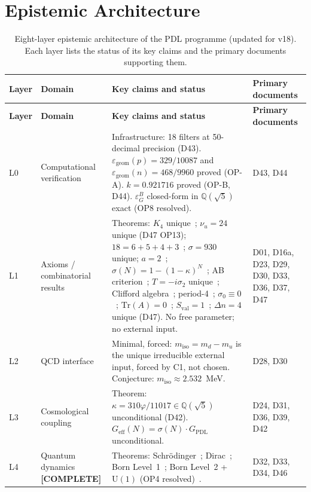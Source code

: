 \documentclass[11pt,a4paper]{article}
\theoremstyle{plain}
\theoremstyle{definition}
\theoremstyle{remark}
\newcommand{\Geff}{G_{\mathrm{eff}}}
\newcommand{\GPDL}{G_{\mathrm{PDL}}}
\newcommand{\sigmaN}{\sigma(N)}
\newcommand{\epsGeomB}{\varepsilon_G^B}
\begin{document}
\section{Epistemic Architecture}
\label{sec:epistemic}

\begin{longtable}{L{0.6cm}L{3.0cm}L{5.5cm}L{4.0cm}}
\caption{Eight-layer epistemic architecture of the PDL programme (updated for v18). Each layer lists the status of its key claims and the primary documents supporting them.}
\label{tab:epistemic}\\
\toprule
\textbf{Layer} & \textbf{Domain} & \textbf{Key claims and status} & \textbf{Primary documents}\\
\midrule
\endfirsthead
\toprule
\textbf{Layer} & \textbf{Domain} & \textbf{Key claims and status} & \textbf{Primary documents}\\
\midrule
\endhead
\bottomrule
\endfoot
L0 & Computational verification & \textcolor{proofblue}{Infrastructure}: 18 filters at 50-decimal precision (D43). $\varepsilon_{\mathrm{geom}}(p)=329/10087$ and $\varepsilon_{\mathrm{geom}}(n)=468/9960$ proved (OP-A). $k=0.921716$ proved (OP-B, D44). $\epsGeomB$ closed-form in $\mathbb{Q}(\sqrt{5})$ exact (OP8 resolved). & D43, D44\\[0.4em]
L1 & Axioms / combinatorial results & \textcolor{proofblue}{Theorems}: $K_4$ unique~\cite{D16a}; $\nu_u=24$ unique (D47 OP13); $18=6+5+4+3$~\cite{D23}; $\sigma=930$ unique; $a=2$~\cite{D30}; $\sigmaN=1-(1-\kappa)^N$~\cite{D24}; AB criterion~\cite{D29}; $T=-i\sigma_2$ unique~\cite{D33}; Clifford algebra~\cite{D33}; period-4~\cite{D33}; $\sigma_0\equiv 0$~\cite{D36}; $\mathrm{Tr}(A)=0$~\cite{D36}; $S_{\mathrm{val}}=1$~\cite{D37}; $\Delta n=4$ unique (D47). No free parameter; no external input. & D01, D16a, D23, D29, D30, D33, D36, D37, D47\\[0.4em]
L2 & QCD interface & Minimal, forced: $m_{\mathrm{iso}}=m_d-m_u$ is the unique irreducible external input, forced by C1, not chosen. \textcolor{conjecturegreen}{Conjecture}: $m_{\mathrm{iso}}\approx 2.532$~MeV. & D28, D30\\[0.4em]
L3 & Cosmological coupling & \textcolor{proofblue}{Theorem}: $\kappa=310\varphi/11017\in\mathbb{Q}(\sqrt{5})$ unconditional (D42). $\Geff(N)=\sigmaN\cdot\GPDL$ unconditional. & D24, D31, D36, D39, D42\\[0.4em]
L4 & Quantum dynamics \textbf{[COMPLETE]} & \textcolor{proofblue}{Theorems}: Schr\"odinger~\cite{D32}; Dirac~\cite{D33}; Born Level~1~\cite{D34}; Born Level~2 + $\mathrm{U}(1)$ (OP4 resolved)~\cite{D46}. & D32, D33, D34, D46\\[0.4em]

\end{longtable}
\end{document}
